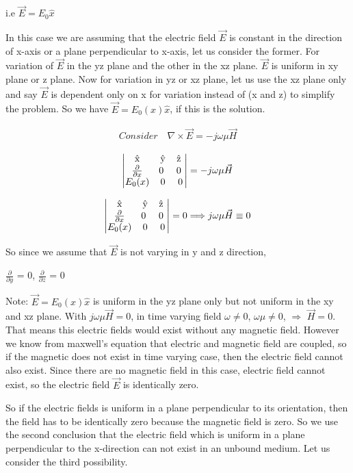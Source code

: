 i.e $\vec{E}={E_{0}}\hat{x}$

In this case we are assuming that the electric field $\vec{E}$ is constant in the direction of x-axis or a plane perpendicular to x-axis, let us consider the former. For variation of $\vec{E}$ in the yz plane and the other in the xz plane. $\vec{E}$ is uniform in xy plane or z plane. Now for variation in yz or xz plane, let us use the xz plane only and say $\vec{E}$ is dependent only on x for variation instead of (x and z) to simplify the problem. So we have $\vec{E}={E_{0}(x)}\hat{x}$, if this is the solution.

\begin{align}
Consider\quad\nabla\times\vec{E}=-j\omega\mu\vec{H}
\end{align}


\[
\begin{vmatrix}
$\^{x}$ & $\^{y}$ & $\^{z} $\\
$$\frac{\partial}{\partial x}$$ & $0 $ & $0 $\\
$$E_{0}(x)$$ & 0 & 0
\end{vmatrix} =
-j\omega \mu \vec{H}
\]




\[
\begin{vmatrix}
$\^{x}$ & $\^{y}$ & $\^{z} $ \\
$$\frac{\partial}{\partial x}$$ & $0 $ & $0 $ \\
$$E_{0}(x)$$ & 0 & 0
\end{vmatrix} =0 \Longrightarrow j\omega\mu\vec{H}\equiv0
\]

So since we assume that $\vec{E}$ is not varying in y and z direction,

$\frac{\partial}{\partial y}$ = 0,
$\frac{\partial}{\partial z}$ = 0

Note:  $\vec{E}={E_{0}(x)\hat{x}}$ is uniform in the yz plane only but not uniform in the xy and xz plane. With $j\omega\mu\vec{H}=0$, in time varying field $\omega\neq0$, $\omega\mu\neq0$, $\Longrightarrow$ $\vec{H}=0$. That means this electric fields would exist without any magnetic field. However we know from maxwell's equation that electric and magnetic field are coupled, so if the magnetic does not exist in time varying case, then the electric field cannot also exist. Since there are no magnetic field in this case, electric field cannot exist, so the electric field $\vec{E}$ is identically zero.

So if the electric fields is uniform in a plane perpendicular to its orientation, then the field has to be identically zero because the magnetic field is zero. So we use the second conclusion that the electric field which is uniform in a plane perpendicular to the x-direction can not exist in an unbound medium. Let us consider the third possibility.


